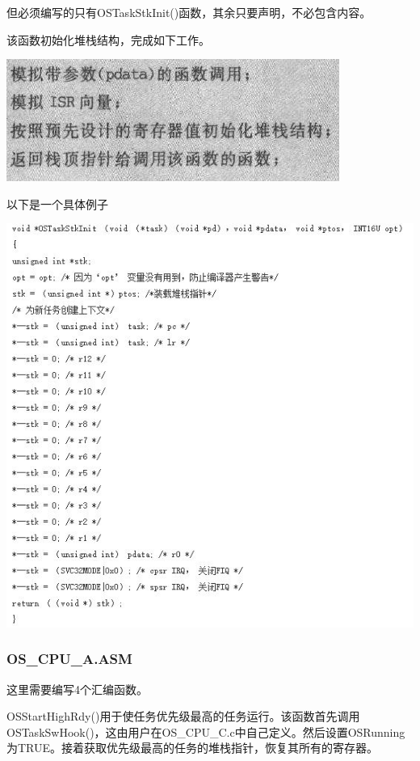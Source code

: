\documentclass{ctexart}
\begin{document}
但必须编写的只有OSTaskStkInit()函数，其余只要声明，不必包含内容。

该函数初始化堆栈结构，完成如下工作。

\centerline{\includegraphics[scale=0.65]{004}}\par

以下是一个具体例子\cite{blog}

\centerline{\includegraphics[scale=0.75]{example}}\par

\subsubsection{OS\_CPU\_A.ASM}
 这里需要编写4个汇编函数。
 
 OSStartHighRdy()用于使任务优先级最高的任务运行。该函数首先调用OSTaskSwHook()，这由用户在OS\_CPU\_C.c中自己定义。然后设置OSRunning为TRUE。接着获取优先级最高的任务的堆栈指针，恢复其所有的寄存器。
        
\end{document}
